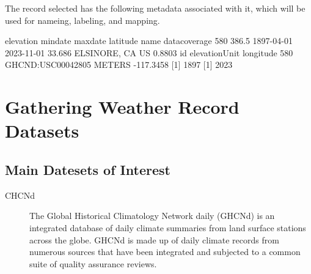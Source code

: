 \documentclass{article}
\begin{document}
\begin{itemize}
\begin{knitrout}
\begin{kframe}
\begin{alltt}
 \hlkwb{=} \hlstd{(}\hlstd{=}\hlstd{,}
                              \hlstd{=} \hlstd{,}
                              \hlstd{=} \hlstd{(}\hlstd{,} \hlstd{))}

 \hlkwb{=} \hlopt{$}
\hlstd{\}}


\hlopt{$} \hlkwb{<-} \hlstd{(}\hlstd{,} \hlopt{$}
\end{alltt}
\end{kframe}
\end{knitrout}

The record selected has the following metadata associated with it, which will be used for nameing, labeling, and mapping. 

    elevation    mindate    maxdate latitude            name datacoverage
580     386.5 1897-04-01 2023-11-01   33.686 ELSINORE, CA US       0.8803
                   id elevationUnit longitude
580 GHCND:USC00042805        METERS -117.3458
[1] 1897
[1] 2023


\section{Gathering Weather Record Datasets}

\subsection{Main Datesets of Interest}

\begin{description}

  \item[CHCNd]The Global Historical Climatology Network daily (GHCNd) is an integrated database of daily climate summaries from land surface stations across the globe. GHCNd is made up of daily climate records from numerous sources that have been integrated and subjected to a common suite of quality assurance reviews.
  

\end{description}
\end{itemize}
\end{document}
